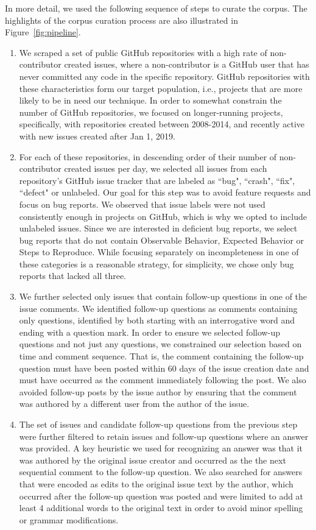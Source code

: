 In more detail, we used the following sequence of steps to curate the corpus. The highlights of the corpus curation process are also illustrated in Figure~\ref{fig:pipeline}.
\begin{enumerate}
\item We scraped a set of public GitHub repositories with a high rate of
non-contributor created issues, where a non-contributor is a GitHub user that has never
committed any code in the specific repository. GitHub repositories with these characteristics form
our target population, i.e., projects that are more likely to be in need our technique. In order
to somewhat constrain the number of GitHub repositories, we focused on longer-running projects,
specifically, with repositories created between 2008-2014, and recently active with new issues created after Jan 1, 2019.
\item For each of these repositories, in descending order of their number of non-contributor created issues per day,
we selected all issues from each repository's GitHub issue tracker that are labeled as ``bug", ``crash", ``fix", ``defect" or unlabeled.
Our goal for this step was to avoid feature requests and focus on bug reports. We observed that issue labels were not used consistently enough
in projects on GitHub, which is why we opted to include unlabeled issues. Since we are interested in deficient bug reports, we select bug reports that do not contain Observable Behavior, Expected Behavior or Steps to Reproduce. While focusing separately on incompleteness in one of these categories is a reasonable strategy, for simplicity, we chose only bug reports that lacked all three.
\item We further selected only issues that contain follow-up questions in one of the issue comments.  We identified follow-up questions as  comments containing only questions, identified by both starting with an interrogative word and ending with a question mark. In order to ensure we selected follow-up questions and not just
any questions, we constrained our selection based on time and comment sequence. That is, the comment containing the follow-up question must have been posted within 60 days of the issue creation date and must have occurred as the comment immediately following the post. We also avoided follow-up posts by the issue author by ensuring that the comment was authored by a different user from the author of the issue.
\item The set of issues and candidate follow-up questions from the previous step were further filtered to
retain issues and follow-up questions where an answer was provided. A key heuristic we used for recognizing an answer was that it was authored
by the original issue creator and occurred as the the next sequential comment
to the follow-up question. We also searched for answers that were encoded as edits to the original issue text by the author, which occurred after the follow-up question was posted and were limited to add at least 4 additional words to the original text in order to avoid minor spelling or grammar modifications.
\end{enumerate}

